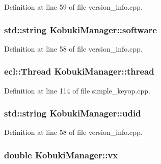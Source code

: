 \-Definition at line 59 of file version\-\_\-info.\-cpp.

\subsubsection[{software}]{\setlength{\rightskip}{0pt plus 5cm}std\-::string {\bf \-Kobuki\-Manager\-::software}\hspace{0.3cm}{\ttfamily  [private]}}\label{classKobukiManager_ada9d19dceec947a9722f64d6f4248a2d}


\-Definition at line 58 of file version\-\_\-info.\-cpp.

\subsubsection[{thread}]{\setlength{\rightskip}{0pt plus 5cm}ecl\-::\-Thread {\bf \-Kobuki\-Manager\-::thread}\hspace{0.3cm}{\ttfamily  [private]}}\label{classKobukiManager_a1b27acea43b82e5fae01be809e67441e}


\-Definition at line 114 of file simple\-\_\-keyop.\-cpp.

\subsubsection[{udid}]{\setlength{\rightskip}{0pt plus 5cm}std\-::string {\bf \-Kobuki\-Manager\-::udid}\hspace{0.3cm}{\ttfamily  [private]}}\label{classKobukiManager_a7f3b07bf7e4d7ce7d601e102ab2bd723}


\-Definition at line 58 of file version\-\_\-info.\-cpp.

\subsubsection[{vx}]{\setlength{\rightskip}{0pt plus 5cm}double {\bf \-Kobuki\-Manager\-::vx}\hspace{0.3cm}{\ttfamily  [private]}}\label{classKobukiManager_a8cd29df6791201832b94af21cb6796c2}


